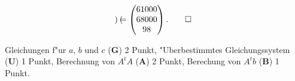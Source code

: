 \begin{loesung}
\begin{align*}
\begin{pmatrix}
\end{pmatrix}=\begin{pmatrix}61000\\68000\\98\end{pmatrix}.
\qedhere
\end{align*}
\end{loesung}

\begin{bewertung}
Gleichungen f"ur $a$, $b$ und $c$ ({\bf G}) 2 Punkt,
"Uberbestimmtes Gleichungssystem ({\bf U}) 1 Punkt,
Berechnung von $A^tA$ ({\bf A}) 2 Punkt,
Berechung von $A^tb$ ({\bf B}) 1 Punkt.
\end{bewertung}

